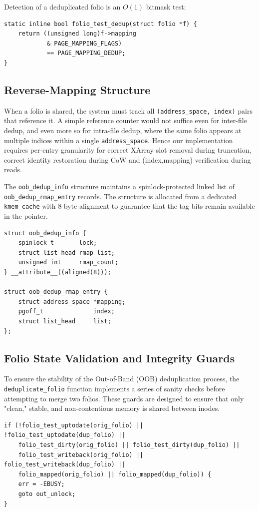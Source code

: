 \documentclass[conference]{IEEEtran}
\begin{document}
Detection of a deduplicated folio is an $O(1)$ bitmask test:
\begin{lstlisting}[numbers=none]
static inline bool folio_test_dedup(struct folio *f) {
    return ((unsigned long)f->mapping
            & PAGE_MAPPING_FLAGS)
            == PAGE_MAPPING_DEDUP;
}
\end{lstlisting}

\subsection{Reverse-Mapping Structure}

When a folio is shared, the system must track all \texttt{(address\_space, index)} pairs that reference it. A simple reference counter would not suffice even for inter-file dedup, and even more so for intra-file dedup, where the same folio appears at multiple indices within a single \texttt{address\_space}. Hence our implementation requires per-entry granularity for correct XArray slot removal during truncation, correct identity restoration during CoW and (index,mapping) verification during reads.

The \texttt{oob\_dedup\_info} structure maintains a spinlock-protected linked list of \texttt{oob\_dedup\_rmap\_entry} records. The structure is allocated from a dedicated \texttt{kmem\_cache} with 8-byte alignment to guarantee that the tag bits remain available in the pointer.

\begin{lstlisting}[numbers=none]
struct oob_dedup_info {
    spinlock_t       lock;
    struct list_head rmap_list;
    unsigned int     rmap_count;
} __attribute__((aligned(8)));

struct oob_dedup_rmap_entry {
    struct address_space *mapping;
    pgoff_t              index;
    struct list_head     list;
};
\end{lstlisting}

\subsection{Folio State Validation and Integrity Guards}

To ensure the stability of the Out-of-Band (OOB) deduplication process, the \texttt{deduplicate\_folio} function implements a series of  sanity checks before attempting to merge two folios. These guards are designed to ensure that only "clean," stable, and non-contentious memory is shared between inodes.

\begin{lstlisting}[numbers=none]
if (!folio_test_uptodate(orig_folio) || !folio_test_uptodate(dup_folio) ||
    folio_test_dirty(orig_folio) || folio_test_dirty(dup_folio) ||
    folio_test_writeback(orig_folio) || folio_test_writeback(dup_folio) ||
    folio_mapped(orig_folio) || folio_mapped(dup_folio)) {
    err = -EBUSY;
    goto out_unlock;
}
\end{lstlisting}
\end{document}
